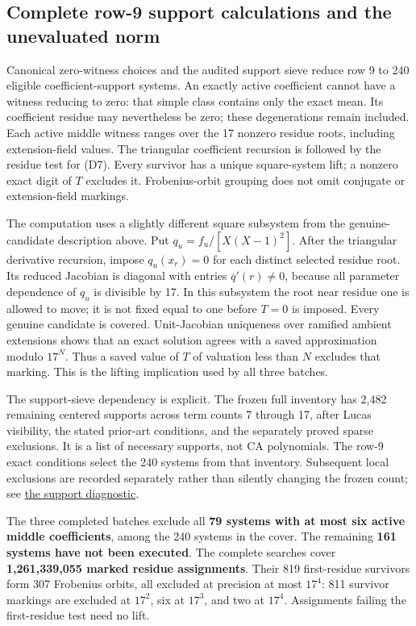\documentclass[
  british,
  10pt,
]{article}
\begin{document}
\subsection{Complete row-9 support calculations and the unevaluated
norm}\label{complete-row-9-support-calculations-and-the-unevaluated-norm}

Canonical zero-witness choices and the audited support sieve reduce row
9 to 240 eligible coefficient-support systems. An exactly active
coefficient cannot have a witness reducing to zero: that simple class
contains only the exact mean. Its coefficient residue may nevertheless
be zero; these degenerations remain included. Each active middle witness
ranges over the 17 nonzero residue roots, including extension-field
values. The triangular coefficient recursion is followed by the residue
test for (D7). Every survivor has a unique square-system lift; a nonzero
exact digit of \(T\) excludes it. Frobenius-orbit grouping does not omit
conjugate or extension-field markings.

The computation uses a slightly different square subsystem from the
genuine-candidate description above. Put \(q_u=f_u/[X(X-1)^2]\). After
the triangular derivative recursion, impose \(q_u(x_r)=0\) for each
distinct selected residue root. Its reduced Jacobian is diagonal with
entries \(\overline q'(r)\ne0\), because all parameter dependence of
\(q_u\) is divisible by 17. In this subsystem the root near residue one
is allowed to move; it is not fixed equal to one before \(T=0\) is
imposed. Every genuine candidate is covered. Unit-Jacobian uniqueness
over ramified ambient extensions shows that an exact solution agrees
with a saved approximation modulo \(17^N\). Thus a saved value of \(T\)
of valuation less than \(N\) excludes that marking. This is the lifting
implication used by all three batches.

The support-sieve dependency is explicit. The frozen full inventory has
2,482 remaining centered supports across term counts 7 through 17, after
Lucas visibility, the stated prior-art conditions, and the separately
proved sparse exclusions. It is a list of necessary supports, not CA
polynomials. The row-9 exact conditions select the 240 systems from that
inventory. Subsequent local exclusions are recorded separately rather
than silently changing the frozen count; see
\href{evidence/full/support_frontier/REPORT.md}{the support diagnostic}.

The three completed batches exclude all \textbf{79 systems with at most
six active middle coefficients}, among the 240 systems in the cover. The
remaining \textbf{161 systems have not been executed}. The complete
searches cover \textbf{1,261,339,055 marked residue assignments}. Their
819 first-residue survivors form 307 Frobenius orbits, all excluded at
precision at most \(17^4\): 811 survivor markings are excluded at
\(17^2\), six at \(17^3\), and two at \(17^4\). Assignments failing the
first-residue test need no lift.
\end{document}
